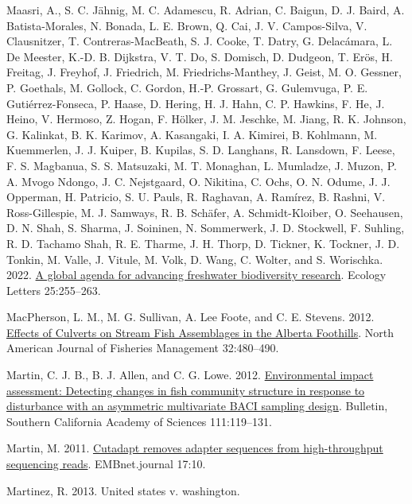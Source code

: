 \documentclass[
]{article}
\newlength{\cslhangindent}
\newlength{\cslentryspacingunit} %
\newenvironment{CSLReferences}[2] %
 {%
  \setlength{\parindent}{0pt}
  \ifodd #1
  \let\oldpar\par
  \def\par{\hangindent=\cslhangindent\oldpar}
  \fi
  \setlength{\parskip}{#2\cslentryspacingunit}
 }%
 {}
\begin{document}
\begin{CSLReferences}{1}{0}
\leavevmode{}%
Maasri, A., S. C. Jähnig, M. C. Adamescu, R. Adrian, C. Baigun, D. J.
Baird, A. Batista-Morales, N. Bonada, L. E. Brown, Q. Cai, J. V.
Campos-Silva, V. Clausnitzer, T. Contreras-MacBeath, S. J. Cooke, T.
Datry, G. Delacámara, L. De Meester, K.-D. B. Dijkstra, V. T. Do, S.
Domisch, D. Dudgeon, T. Erös, H. Freitag, J. Freyhof, J. Friedrich, M.
Friedrichs-Manthey, J. Geist, M. O. Gessner, P. Goethals, M. Gollock, C.
Gordon, H.-P. Grossart, G. Gulemvuga, P. E. Gutiérrez-Fonseca, P. Haase,
D. Hering, H. J. Hahn, C. P. Hawkins, F. He, J. Heino, V. Hermoso, Z.
Hogan, F. Hölker, J. M. Jeschke, M. Jiang, R. K. Johnson, G. Kalinkat,
B. K. Karimov, A. Kasangaki, I. A. Kimirei, B. Kohlmann, M. Kuemmerlen,
J. J. Kuiper, B. Kupilas, S. D. Langhans, R. Lansdown, F. Leese, F. S.
Magbanua, S. S. Matsuzaki, M. T. Monaghan, L. Mumladze, J. Muzon, P. A.
Mvogo Ndongo, J. C. Nejstgaard, O. Nikitina, C. Ochs, O. N. Odume, J. J.
Opperman, H. Patricio, S. U. Pauls, R. Raghavan, A. Ramírez, B. Rashni,
V. Ross-Gillespie, M. J. Samways, R. B. Schäfer, A. Schmidt-Kloiber, O.
Seehausen, D. N. Shah, S. Sharma, J. Soininen, N. Sommerwerk, J. D.
Stockwell, F. Suhling, R. D. Tachamo Shah, R. E. Tharme, J. H. Thorp, D.
Tickner, K. Tockner, J. D. Tonkin, M. Valle, J. Vitule, M. Volk, D.
Wang, C. Wolter, and S. Worischka. 2022.
\href{https://doi.org/10.1111/ele.13931}{A global agenda for advancing
freshwater biodiversity research}. Ecology Letters 25:255--263.

\leavevmode{}%
MacPherson, L. M., M. G. Sullivan, A. Lee Foote, and C. E. Stevens.
2012. \href{https://doi.org/10.1080/02755947.2012.686004}{Effects of
Culverts on Stream Fish Assemblages in the Alberta Foothills}. North
American Journal of Fisheries Management 32:480--490.

\leavevmode{}%
Martin, C. J. B., B. J. Allen, and C. G. Lowe. 2012.
\href{https://doi.org/10.3160/0038-3872-111.2.119}{Environmental impact
assessment: Detecting changes in fish community structure in response to
disturbance with an asymmetric multivariate BACI sampling design}.
Bulletin, Southern California Academy of Sciences 111:119--131.

\leavevmode{}%
Martin, M. 2011. \href{https://doi.org/10.14806/ej.17.1.200}{Cutadapt
removes adapter sequences from high-throughput sequencing reads}.
EMBnet.journal 17:10.

\leavevmode{}%
Martinez, R. 2013. United states v. washington.


\end{CSLReferences}
\end{document}
